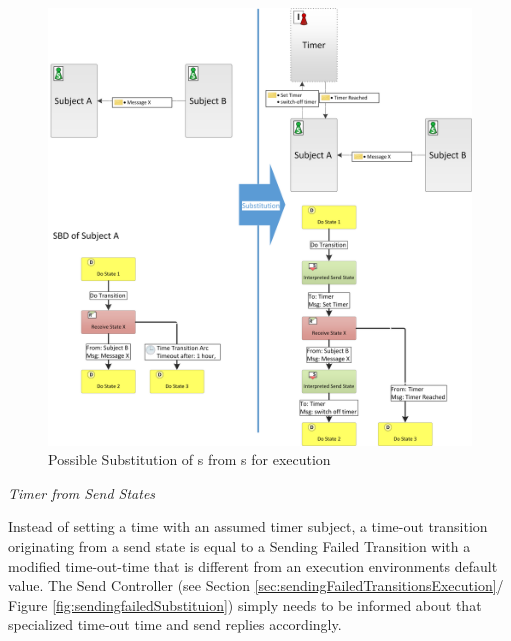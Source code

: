 \begin{figure}[hp]
	\centering
	\includegraphics[width=1.0\linewidth]{Figures/Ontology/TimeOutReceiveStateInterpretationSIDSBD.png}
	\caption[Possible Substitution of s from s for execution]{Possible Substitution of s from s for execution}
	\label{fig:timeOutReceivesubstitution}
\end{figure}

\emph{Timer from Send States}

Instead of setting a time with an assumed timer subject, a time-out transition originating from a send state is equal to a Sending Failed Transition with a modified time-out-time that is different from an execution environments default value. The Send Controller (see Section \ref{sec:sendingFailedTransitionsExecution}/ Figure \ref{fig:sendingfailedSubstituion}) simply needs to be informed about that specialized time-out time and send replies accordingly. 

